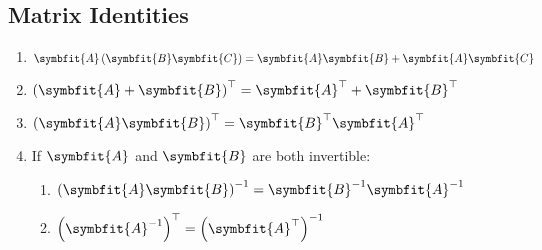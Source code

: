 \documentclass{article}
\begin{document}
\begin{multicols*}{2}
    \section*{Matrix Identities}
    \begin{enumerate}
        \item \(\symbfit{A}\left( \symbfit{B}\symbfit{C} \right) = \symbfit{A}\symbfit{B}+\symbfit{A}\symbfit{C}\)
        \item \(\left( \symbfit{A}+\symbfit{B} \right)^\top = \symbfit{A}^\top + \symbfit{B}^\top\)
        \item \(\left( \symbfit{A}\symbfit{B} \right)^\top = \symbfit{B}^\top \symbfit{A}^\top\)
        \item If \(\symbfit{A}\) and \(\symbfit{B}\) are both invertible:
              \begin{enumerate}
                  \item \(\left( \symbfit{A}\symbfit{B} \right)^{-1} = \symbfit{B}^{-1}\symbfit{A}^{-1}\)
                  \item \(\left( \symbfit{A}^{-1} \right)^\top = \left( \symbfit{A}^\top \right)^{-1}\)
              \end{enumerate}
    \end{enumerate}
\end{multicols*}
\end{document}
